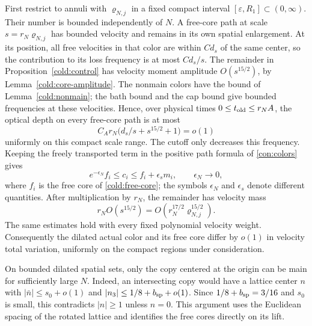 First restrict to annuli with \(\varrho_{N,j}\) in a fixed compact
interval \([\varepsilon,R_1]\subset(0,\infty)\). Their number is
bounded independently of \(N\). A free-core path at scale
\(s=r_N\varrho_{N,j}\) has bounded velocity and remains in its own
spatial enlargement. At its position, all free velocities in that
color are within \(C d_s\) of the same center, so the contribution
to its loss frequency is at most \(C d_s/s\).
The remainder in Proposition~\ref{cold:control} has velocity moment
amplitude \(O(s^{15/2})\), by Lemma~\ref{cold:core-amplitude}.
The nonmain colors have the bound of Lemma~\ref{cold:nonmain}; the
bath bound and the cap bound give bounded frequencies at these
velocities. Hence, over physical times \(0\le t_{\rm old}\le r_NA\),
the optical depth on every free-core path is at most
\[
 C_A r_N\bigl(d_s/s+s^{15/2}+1\bigr)=o(1)
\]
uniformly on this compact scale range. The cutoff only decreases
this frequency. Keeping the freely transported term in the positive
path formula of \eqref{con:colors} gives
\[
 e^{-\epsilon_N}f_i\le c_i\le f_i+\epsilon_s m_i,
 \qquad \epsilon_N\longrightarrow0,
\]
where \(f_i\) is the free core of \eqref{cold:free-core}; the symbols
\(\epsilon_N\) and \(\epsilon_s\) denote different quantities.
After multiplication by \(r_N\), the remainder has velocity mass
\begin{equation}\label{dil:remainder-power}
 r_N O(s^{15/2})=O(r_N^{17/2}\varrho_{N,j}^{15/2}).
\end{equation}
The same estimates hold with every fixed polynomial velocity weight.
Consequently the dilated actual color and its free core differ by
\(o(1)\) in velocity total variation, uniformly on the compact
regions under consideration.

On bounded dilated spatial sets, only the copy centered at the origin
can be main for sufficiently large \(N\). Indeed, an intersecting
copy would have a lattice center \(n\) with
\(|\bar n|\le s_0+o(1)\) and
\(|n_3|\le 1/8+b_{\rm sp}+o(1)\). Since \(1/8+b_{\rm sp}=3/16\)
and \(s_0\) is small, this contradicts \(|n|\ge1\) unless
\(n=0\). This argument uses the Euclidean spacing of the rotated
lattice and identifies the free cores directly on its lift.

